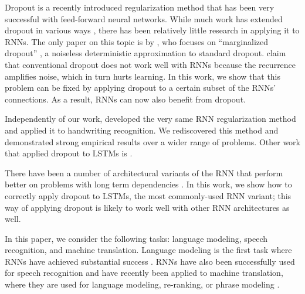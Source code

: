 \documentclass{article}
\begin{document}
Dropout \cite{srivastava2013improving} is a recently introduced
regularization method that has been very successful with
feed-forward neural networks.   While much work has extended dropout in  
various ways \cite{wang2013fast,wan2013regularization}, there has
been relatively little research in applying it to RNNs. The only
paper on this topic is by \citet{bayer2013fast}, who focuses on
``marginalized dropout'' \cite{wang2013fast}, a
noiseless deterministic approximation to standard dropout.
\citet{bayer2013fast} claim that conventional dropout does not work well
with RNNs because the recurrence amplifies noise, which in turn hurts learning. 
In this work, we show that this problem can be fixed by
applying dropout to a certain subset of the RNNs' connections.  As a result, RNNs
can now also benefit from dropout.




Independently of our work, \cite{pham2013dropout} developed the very same RNN 
regularization method and applied it to handwriting recognition.  We rediscovered
this method and demonstrated strong empirical results over a wider range of problems. 
Other work that applied dropout to LSTMs is \cite{pachitariu2013regularization}.

There have been a number of architectural variants of the RNN that
perform better on problems with long term dependencies
\cite{hochreiter1997long, graves2009novel, cho2014learning,
  jaeger2007optimization, koutnik2014clockwork, sundermeyer2012lstm}.  In this work, we
show how to correctly apply dropout to LSTMs, the most
commonly-used RNN variant; this way of applying dropout is likely to
work well with other RNN architectures as well. 

In this paper, we consider the following tasks: language modeling,
speech recognition, and machine translation.  Language modeling is the
first task where RNNs have achieved substantial success
\cite{mikolov2010recurrent, mikolov2011strategies,
  pascanu2013construct}.  RNNs have also been successfully used for
speech recognition \cite{robinson1996use, graves2013speech} and have
recently been applied to machine translation, where they are 
used for language modeling, re-ranking, or phrase modeling
\cite{devlin14,kal13,cho2014learning,chow1987byblos,mikolov2013exploiting}.
\end{document}
